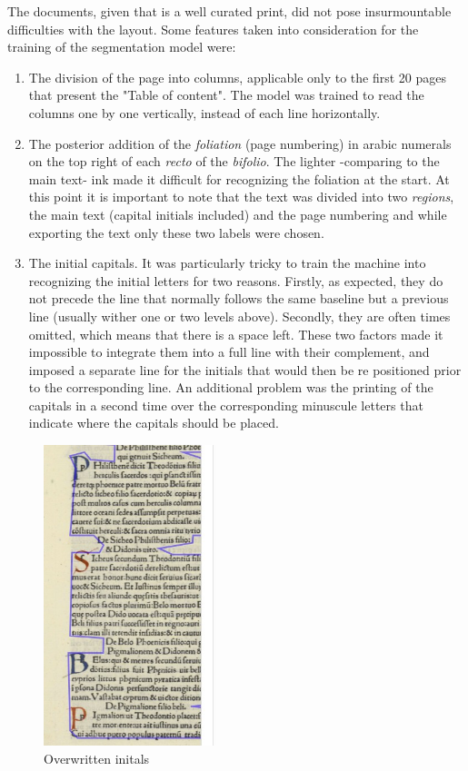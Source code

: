 \documentclass[12pt]{article}
\begin{document}
The documents, given that is a well curated print, did not pose insurmountable difficulties with the layout. Some features taken into consideration for the training of the segmentation model were:
\begin{enumerate}
    \item The division of the page into columns, applicable only to the first 20 pages that present the "Table of content". The model was trained to read the columns one by one vertically, instead of each line horizontally.
    \item  The posterior addition of the \textit{foliation} (page numbering) in arabic numerals on the top right of each \textit{recto} of the \textit{bifolio}. The lighter -comparing to the main text- ink  made it difficult for recognizing the foliation at the start. At this point it is important to note that the text was divided into two \textit{regions}, the main text (capital initials included) and the page numbering and while exporting the text only these two labels were chosen.
    \item The initial capitals. It was particularly tricky to train the machine into recognizing the initial letters for two reasons. Firstly, as expected, they do not precede the line that normally follows the same baseline but a previous line (usually wither one or two levels above). Secondly, they are often times omitted, which means that there is a space left. These two factors made it impossible to integrate them into a full line with their complement, and imposed a separate line for the initials that would then be re positioned prior to the corresponding line. 
    An additional problem was the printing of the capitals in a second time over the corresponding minuscule letters that indicate where the capitals should be placed. 
 \end{enumerate}   
 
\begin{figure}[h!]
    \centering
    \includegraphics[width=5cm]{initial_capitals.jpg}
    \caption{Overwritten initals}
    \label{fig:PremFigure}
\end{figure}
\end{document}

